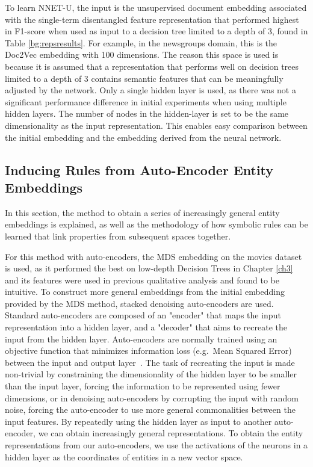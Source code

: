 To learn NNET-U, the input is the unsupervised document embedding associated with the single-term disentangled feature representation that performed highest in F1-score when used as input to a  decision tree limited to a depth of 3,  found in Table \ref{bg:repsresults}. For example, in the newsgroups domain, this is the Doc2Vec embedding with 100 dimensions. The reason this space is used is because it is assumed that a representation that performs well on  decision trees limited to a depth of 3 contains semantic features that can be meaningfully adjusted by the network. Only a single hidden layer is used, as there was not a significant performance difference in initial experiments when using multiple hidden layers. The number of nodes in the hidden-layer is set to be the same dimensionality as the input representation. This enables easy comparison between the initial  embedding and the embedding derived from the neural network.







\subsection{Inducing Rules from Auto-Encoder Entity Embeddings}\label{InducingRulesFromEntityEmbeddings}

In this section, the method to obtain a series of increasingly general entity embeddings is explained, as well as the methodology of how symbolic rules can be learned that link properties from subsequent spaces together. 

For this method with auto-encoders, the MDS embedding on the movies dataset is used, as it performed the best on low-depth Decision Trees in Chapter \ref{ch3} and its features were used in previous qualitative analysis and found to be intuitive. To construct more general embeddings from the initial embedding provided by the MDS method, stacked denoising auto-encoders \cite{Vincent2008a} are used. Standard auto-encoders are composed of an "encoder" that maps the input representation into a hidden layer, and a "decoder" that aims to recreate the input from the hidden layer. Auto-encoders are normally trained using an objective function that minimizes information loss (e.g.\ Mean Squared Error) between the input and output layer~\cite{Bengio2009}. The task of recreating the input is made non-trivial by constraining the dimensionality of the hidden layer to be smaller than the input layer, forcing the information to be represented using fewer dimensions, or in denoising auto-encoders by corrupting the input with random noise, forcing the auto-encoder to use more general commonalities between the input features. By repeatedly  using the hidden layer as input to another auto-encoder, we can obtain increasingly general representations. To obtain the entity representations from our auto-encoders, we use the activations of the neurons in a hidden layer as the coordinates of entities in a new vector space. 

